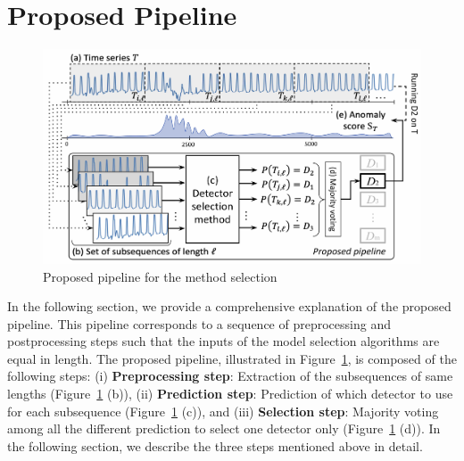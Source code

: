 \section{Proposed Pipeline}
\label{sec:proposed}

\begin{figure}
    \centering
    \includegraphics[width=1\linewidth]{figures/Fig3.jpg}
    \caption{Proposed pipeline for the method selection}
    \label{fig:proposed_work}
\end{figure}

In the following section, we provide a comprehensive explanation of the proposed pipeline. This pipeline corresponds to a sequence of preprocessing and postprocessing steps such that the inputs of the model selection algorithms are equal in length. The proposed pipeline, illustrated in Figure~\ref{fig:proposed_work}, is composed of the following steps: (i) \textbf{Preprocessing step}: Extraction of the subsequences of same lengths (Figure~\ref{fig:proposed_work} (b)), (ii) \textbf{Prediction step}: Prediction of which detector to use for each subsequence (Figure~\ref{fig:proposed_work} (c)), and (iii) \textbf{Selection step}: Majority voting among all the different prediction to select one detector only (Figure~\ref{fig:proposed_work} (d)). In the following section, we describe the three steps mentioned above in detail.

